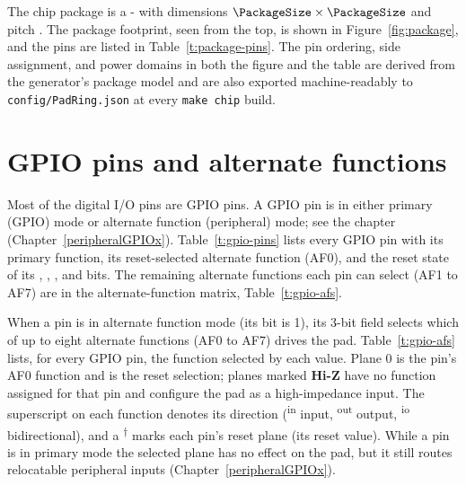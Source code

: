 \documentclass[11pt,pdftex,openany,letterpaper]{report}
\begin{document}
The chip package is a {\PackageTypeName}-{\PackagePinCount} with dimensions $\PackageSize \times \PackageSize$ {\PackageUnits} and pitch {\PackagePinPitch} {\PackageUnits}. The package footprint, seen from the top, is shown in Figure~\ref{fig:package}, and the pins are listed in Table~\ref{t:package-pins}. The pin ordering, side assignment, and power domains in both the figure and the table are derived from the generator's package model and are also exported machine-readably to \texttt{config/PadRing.json} at every \texttt{make chip} build.



\section{GPIO pins and alternate functions}

Most of the digital I/O pins are GPIO pins. A GPIO pin is in either primary (GPIO) mode or alternate function (peripheral) mode; see the  chapter (Chapter~\ref{peripheralGPIOx}). Table~\ref{t:gpio-pins} lists every GPIO pin with its primary function, its reset-selected alternate function (AF0), and the reset state of its , , , and  bits. The remaining alternate functions each pin can select (AF1 to AF7) are in the alternate-function matrix, Table~\ref{t:gpio-afs}.



When a pin is in alternate function mode (its  bit is 1), its 3-bit  field selects which of up to eight alternate functions (AF0 to AF7) drives the pad. Table~\ref{t:gpio-afs} lists, for every GPIO pin, the function selected by each  value. Plane 0 is the pin's AF0 function and is the reset selection; planes marked \textbf{Hi-Z} have no function assigned for that pin and configure the pad as a high-impedance input. The superscript on each function denotes its direction (\textsuperscript{\scriptsize in} input, \textsuperscript{\scriptsize out} output, \textsuperscript{\scriptsize io} bidirectional), and a \textsuperscript{$\dagger$} marks each pin's reset plane (its  reset value). While a pin is in primary mode the selected plane has no effect on the pad, but it still routes relocatable peripheral inputs (Chapter~\ref{peripheralGPIOx}).


\end{document}
